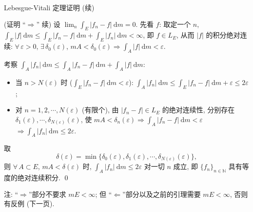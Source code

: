 \begin{frame}{Lebesgue-Vitali 定理证明 (续)}

\startproof[bg=yellow, fg=red](证明 ``$\Rightarrow$'' 续)
设 $\lim_n \int_E |f_n - f| ~ \mathrm{d} m = 0$. 先看 $f$: 取定一个 $n$,
$\int_E |f| ~ \mathrm{d} m \leqslant \int_E |f_n - f| ~ \mathrm{d} m + \int_E |f_n| ~ \mathrm{d} m < \infty$,
即 $f \in L_E$, 从而 $|f|$ 的积分绝对连续: $\forall\, \varepsilon > 0$, $\exists\, \delta_0(\varepsilon)$,
$mA < \delta_0(\varepsilon) \Rightarrow \int_A |f| ~ \mathrm{d} m < \varepsilon$.

\pause

考察 $\int_A |f_n| ~ \mathrm{d} m \leqslant \int_A |f_n - f| ~ \mathrm{d} m + \int_A |f| ~ \mathrm{d} m$:
\begin{itemize}
\item 当 $n > N(\varepsilon)$ 时
  ($\int_E |f_n - f| ~ \mathrm{d} m < \varepsilon$):
  $\int_A |f_n| ~ \mathrm{d} m \leqslant \int_E |f_n - f| ~ \mathrm{d} m + \varepsilon \leqslant 2\varepsilon$;
\pause
\item 对 $n = 1, 2, \cdots, N(\varepsilon)$ (有限个), 由 $|f_n - f| \in L_E$ 的绝对连续性, 分别存在
  $\delta_1(\varepsilon), \cdots, \delta_{N(\varepsilon)}(\varepsilon)$, 使
  $mA < \delta_n(\varepsilon) \Rightarrow \int_A |f_n - f| ~ \mathrm{d} m < \varepsilon$
  $\Rightarrow \int_A |f_n| ~ \mathrm{d} m \leqslant 2\varepsilon$.
\end{itemize}

\pause

取
\[
\delta(\varepsilon) = \min \big\{ \delta_0(\varepsilon), \delta_1(\varepsilon), \cdots,
\delta_{N(\varepsilon)}(\varepsilon) \big\} ,
\]
则 $\forall\, A \subset E$, $mA < \delta(\varepsilon)$ 时, $\int_A |f_n| ~ \mathrm{d} m \leqslant 2\varepsilon$
对\alert{一切} $n$ 成立, 即 $\{f_n\}_{n \in \mathbb{N}}$ 具有等度的绝对连续积分. \qed

\pause

\begin{attnblock}
注: ``$\Rightarrow$''部分不要求 $mE < \infty$; 但 ``$\Leftarrow$''部分以及之前的引理需要 $mE < \infty$,
否则有反例 (下一页).
\end{attnblock}

\end{frame}


